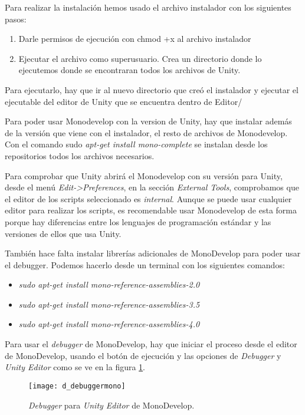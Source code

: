 Para realizar la instalación hemos usado el archivo instalador con los siguientes pasos:
\begin{enumerate}
\item Darle permisos de ejecución con chmod +x al archivo instalador
\item Ejecutar el archivo como superusuario. Crea un directorio donde lo ejecutemos donde se encontraran todos los archivos de Unity.
\end{enumerate}

Para ejecutarlo, hay que ir al nuevo directorio que creó el instalador y ejecutar el ejecutable del editor de Unity que se encuentra dentro de Editor/ 

Para poder usar Monodevelop con la version de Unity, hay que instalar además de la versión que viene con el instalador, el resto de archivos de Monodevelop. Con el comando sudo \textit{apt-get install mono-complete} se instalan desde los repositorios todos los archivos necesarios.

Para comprobar que Unity abrirá el Monodevelop con su versión para Unity, desde el menú \textit{Edit->Preferences}, en la sección \textit{External Tools}, comprobamos que el editor de  los scripts seleccionado es \textit{internal}. Aunque se puede usar cualquier editor para realizar los scripts, es recomendable usar Monodevelop de esta forma porque hay diferencias entre los lenguajes de programación estándar y las versiones de ellos que usa Unity.

También hace falta instalar librerías adicionales de MonoDevelop para poder usar el debugger. Podemos hacerlo desde un terminal con los siguientes comandos:
\begin{itemize}
\item \textit{sudo apt-get install mono-reference-assemblies-2.0}
\item \textit{sudo apt-get install mono-reference-assemblies-3.5}
\item \textit{sudo apt-get install mono-reference-assemblies-4.0}
\end{itemize}

Para usar el \textit{debugger} de MonoDevelop, hay que iniciar el proceso desde el editor de MonoDevelop, usando el botón de ejecución y las opciones de \textit{Debugger} y \textit{Unity Editor} como se ve en la figura \ref{fig:debuggermono}.

\begin{figure}[htpb]
    \centering
    \texttt{[image: d\_debuggermono]}
    \caption[\textit{Debugger} para \textit{Unity Editor} de MonoDevelop]{\textit{Debugger} para \textit{Unity Editor} de MonoDevelop.}
    \label{fig:debuggermono}
\end{figure}

